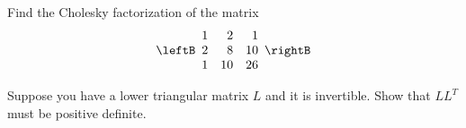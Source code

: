 \begin{enumialphparenastyle}
\begin{ex} Find the Cholesky factorization of the matrix 
\begin{equation*}
\leftB 
\begin{array}{rrr}
1 & 2 & 1 \\ 
2 & 8 & 10 \\ 
1 & 10 & 26
\end{array}
\rightB
\end{equation*}
\end{ex}

\begin{ex} Suppose you have a lower triangular matrix $L$ and it is invertible.
Show that $LL^{T}$ must be positive definite.
\end{ex}

\end{enumialphparenastyle}